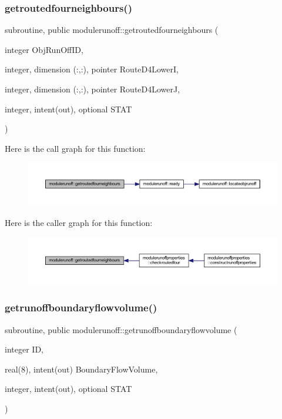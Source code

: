 \subsubsection{\texorpdfstring{getroutedfourneighbours()}{getroutedfourneighbours()}}
{\footnotesize\ttfamily subroutine, public modulerunoff\+::getroutedfourneighbours (\begin{DoxyParamCaption}\item[{integer}]{Obj\+Run\+Off\+ID,  }\item[{integer, dimension (\+:,\+:), pointer}]{Route\+D4\+LowerI,  }\item[{integer, dimension (\+:,\+:), pointer}]{Route\+D4\+LowerJ,  }\item[{integer, intent(out), optional}]{S\+T\+AT }\end{DoxyParamCaption})}

Here is the call graph for this function\+:\nopagebreak
\begin{figure}[H]
\begin{center}
\leavevmode
\includegraphics[width=350pt]{namespacemodulerunoff_a012d41440fbbe25a6de0417a150502fd_cgraph}
\end{center}
\end{figure}
Here is the caller graph for this function\+:\nopagebreak
\begin{figure}[H]
\begin{center}
\leavevmode
\includegraphics[width=350pt]{namespacemodulerunoff_a012d41440fbbe25a6de0417a150502fd_icgraph}
\end{center}
\end{figure}
\mbox{\label{namespacemodulerunoff_a3a9224ad169d37f7fdb8eb535513d1b1}} 
\subsubsection{\texorpdfstring{getrunoffboundaryflowvolume()}{getrunoffboundaryflowvolume()}}
{\footnotesize\ttfamily subroutine, public modulerunoff\+::getrunoffboundaryflowvolume (\begin{DoxyParamCaption}\item[{integer}]{ID,  }\item[{real(8), intent(out)}]{Boundary\+Flow\+Volume,  }\item[{integer, intent(out), optional}]{S\+T\+AT }\end{DoxyParamCaption})}

